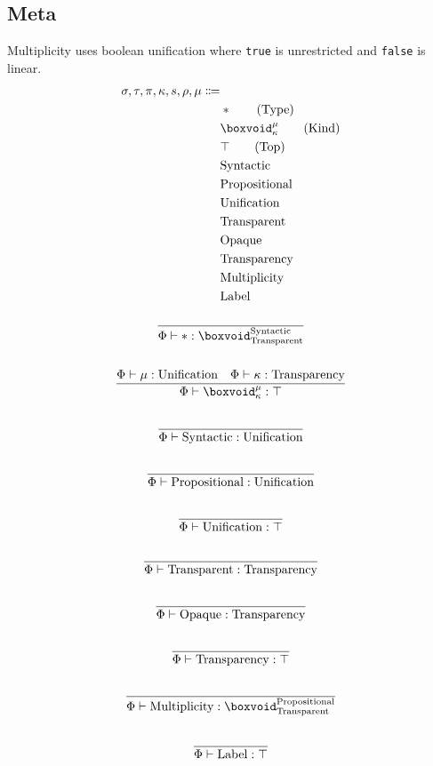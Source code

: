 \documentclass {article}
\begin{document}
\subsection{Meta}
Multiplicity uses boolean unification where \texttt{true} is unrestricted and \texttt{false} is linear.
\begin{align*}
\sigma, \tau, \pi, \kappa, s, \rho, \mu \Coloneqq & \\
& * \tag{Type} \\
& \boxvoid^\mu_{\kappa} \tag{Kind} \\
& \top \tag{Top} \\
& \text{Syntactic} \\
& \text{Propositional} \\
& \text{Unification} \\
& \text{Transparent} \\
& \text{Opaque} \\
& \text{Transparency} \\
& \text{Multiplicity} \\
& \text{Label}
\end{align*}

\begin{gather*}
\frac
{}
{\Phi \vdash * : \boxvoid^{\text{Syntactic}}_{\text{Transparent}}} \\
\\
\frac
{\Phi \vdash \mu : \text{Unification} \quad \Phi \vdash \kappa : \text{Transparency}}
{\Phi \vdash \boxvoid^\mu_{\kappa} : \top} \\
\\
\frac
{}
{\Phi \vdash \text{Syntactic} : \text{Unification}} \\
\\
\frac
{}
{\Phi \vdash \text{Propositional} : \text{Unification}} \\
\\
\frac
{}
{\Phi \vdash \text{Unification} : \top} \\
\\
\frac
{}
{\Phi \vdash \text{Transparent} : \text{Transparency}} \\
\\
\frac
{}
{\Phi \vdash \text{Opaque} : \text{Transparency}} \\
\\
\frac
{}
{\Phi \vdash \text{Transparency} : \top} \\
\\
\frac
{}
{\Phi \vdash \text{Multiplicity} : \boxvoid^{\text{Propositional}}_{\text{Transparent}}} \\
\\
\frac
{}
{\Phi \vdash \text{Label} : \top}
\end{gather*}
\end{document}
